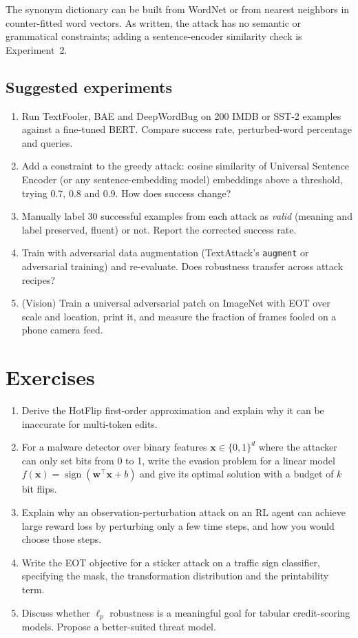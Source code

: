 \documentclass[10pt,a4paper]{extarticle}
\theoremstyle{definition}
\newcommand{\x}{\mathbf{x}}
\DeclareMathOperator{\sign}{sign}
\begin{document}
The synonym dictionary can be built from WordNet or from nearest neighbors in counter-fitted word vectors. As written, the attack has no semantic or grammatical constraints; adding a sentence-encoder similarity check is Experiment~2.

\subsection{Suggested experiments}

\begin{enumerate}[label=\textbf{\arabic*.}]
  \item Run TextFooler, BAE and DeepWordBug on 200 IMDB or SST-2 examples against a fine-tuned BERT. Compare success rate, perturbed-word percentage and queries.
  \item Add a constraint to the greedy attack: cosine similarity of Universal Sentence Encoder (or any sentence-embedding model) embeddings above a threshold, trying 0.7, 0.8 and 0.9. How does success change?
  \item Manually label 30 successful examples from each attack as \emph{valid} (meaning and label preserved, fluent) or not. Report the corrected success rate.
  \item Train with adversarial data augmentation (TextAttack's \texttt{augment} or adversarial training) and re-evaluate. Does robustness transfer across attack recipes?
  \item (Vision) Train a universal adversarial patch on ImageNet with EOT over scale and location, print it, and measure the fraction of frames fooled on a phone camera feed.
\end{enumerate}

\section*{Exercises}

\begin{enumerate}[label=\textbf{\arabic*.}]
  \item Derive the HotFlip first-order approximation and explain why it can be inaccurate for multi-token edits.
  \item For a malware detector over binary features \(\x\in\{0,1\}^d\) where the attacker can only set bits from 0 to 1, write the evasion problem for a linear model \(f(\x)=\sign(\mathbf{w}^\top\x+b)\) and give its optimal solution with a budget of \(k\) bit flips.
  \item Explain why an observation-perturbation attack on an RL agent can achieve large reward loss by perturbing only a few time steps, and how you would choose those steps.
  \item Write the EOT objective for a sticker attack on a traffic sign classifier, specifying the mask, the transformation distribution and the printability term.
  \item Discuss whether \(\ell_p\) robustness is a meaningful goal for tabular credit-scoring models. Propose a better-suited threat model.
\end{enumerate}



\end{document}
